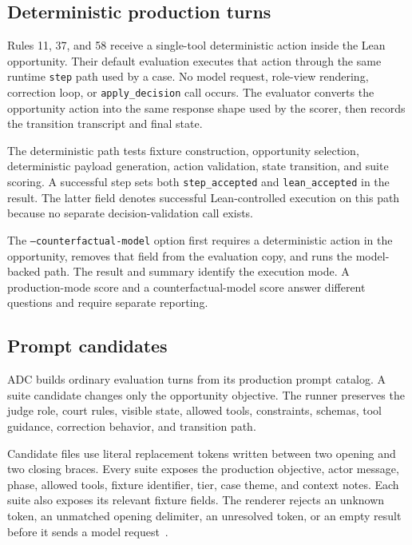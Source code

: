 \documentclass[11pt]{article}
\newcommand{\code}[1]{\texttt{#1}}
\begin{document}
\subsection{Deterministic production turns}

Rules 11, 37, and 58 receive a single-tool deterministic action inside the Lean opportunity.  Their default evaluation executes that action through the same runtime \code{step} path used by a case.  No model request, role-view rendering, correction loop, or \code{apply\_decision} call occurs.  The evaluator converts the opportunity action into the same response shape used by the scorer, then records the transition transcript and final state.

The deterministic path tests fixture construction, opportunity selection, deterministic payload generation, action validation, state transition, and suite scoring.  A successful step sets both \code{step\_accepted} and \code{lean\_accepted} in the result.  The latter field denotes successful Lean-controlled execution on this path because no separate decision-validation call exists.

The \code{--counterfactual-model} option first requires a deterministic action in the opportunity, removes that field from the evaluation copy, and runs the model-backed path.  The result and summary identify the execution mode.  A production-mode score and a counterfactual-model score answer different questions and require separate reporting.

\subsection{Prompt candidates}

ADC builds ordinary evaluation turns from its production prompt catalog.  A suite candidate changes only the opportunity objective.  The runner preserves the judge role, court rules, visible state, allowed tools, constraints, schemas, tool guidance, correction behavior, and transition path.

Candidate files use literal replacement tokens written between two opening and two closing braces.  Every suite exposes the production objective, actor message, phase, allowed tools, fixture identifier, tier, case theme, and context notes.  Each suite also exposes its relevant fixture fields.  The renderer rejects an unknown token, an unmatched opening delimiter, an unresolved token, or an empty result before it sends a model request~\cite{promptguide}.
\end{document}
